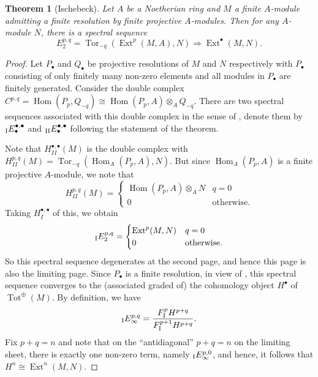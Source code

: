 \documentclass[11pt]{article}
\theoremstyle{thmstyle}
\newtheorem{theorem}{Theorem}
\theoremstyle{defstyle}
\newcommand{\Tor}{\operatorname{Tor}}
\newcommand{\Hom}{\operatorname{Hom}}
\newcommand{\Ext}{\operatorname{Ext}}
\begin{document}
\begin{theorem}[Ischebeck]
    Let $A$ be a Noetherian ring and $M$ a finite $A$-module admitting a finite resolution by finite projective $A$-modules. Then for any $A$-module $N$, there is a spectral sequence 
    \begin{equation*}
        E^{p, q}_2 = \Tor_{-q}\left(\Ext^{p}(M, A), N\right)\Longrightarrow \Ext^{\bullet}(M, N).
    \end{equation*}
\end{theorem}
\begin{proof}
    Let $P_\bullet$ and $Q_\bullet$ be projective resolutions of $M$ and $N$ respectively with $P_\bullet$ consisting of only finitely many non-zero elements and all modules in $P_\bullet$ are finitely generated. Consider the double complex $C^{p, q} = \Hom(P_p, Q_{-q})\cong \Hom(P_p, A)\otimes_A Q_{-q}$. There are two spectral sequences associated with this double complex in the sense of , denote them by ${}_{\rm I}E^{\bullet,\bullet}_\bullet$ and ${}_{\rm II}E^{\bullet,\bullet}_{\bullet}$ following the statement of the theorem. 

    Note that $H^{\bullet, \bullet}_{II}(M)$ is the double complex with $H^{p, q}_{II}(M) = \Tor_{-q}\left(\Hom_A(P_p, A), N\right)$. But since $\Hom_A(P_p, A)$ is a finite projective $A$-module, we note that 
    \begin{equation*}
        H^{p, q}_{II}(M) = 
        \begin{cases}
            \Hom(P_p, A)\otimes_A N &  q = 0\\
            0 & \text{otherwise}.
        \end{cases}
    \end{equation*}
    Taking $H^{\bullet, \bullet}_{I}$ of this, we obtain 
    \begin{equation*}
        {}_{\rm I}E^{p, q}_2 = 
        \begin{cases}
            \Ext^p(M, N) & q = 0\\
            0  & \text{otherwise}.
        \end{cases}
    \end{equation*}
    So this spectral sequence degenerates at the second page, and hence this page is also the limiting page. Since $P_\bullet$ is a finite resolution, in view of , this spectral sequence converges to the (associated graded of) the cohomology object $H^\bullet$ of $\operatorname{Tot}^{\oplus}(M)$. By definition, we have 
    \begin{equation*}
        {}_{\rm I}E^{p, q}_\infty = \frac{F_{\rm I}^p H^{p + q}}{F_{\rm I}^{p + 1}H^{p + q}}.
    \end{equation*}
    Fix $p + q = n$ and note that on the ``antidiagonal'' $p + q = n$ on the limiting sheet, there is exactly one non-zero term, namely ${}_{\rm I}E^{p, 0}_\infty$, and hence, it follows that $H^n\cong \Ext^n(M, N)$.


\end{proof}
\end{document}
